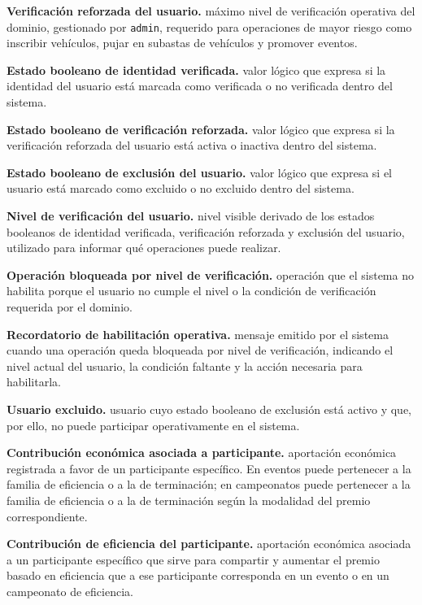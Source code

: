 \documentclass[10pt,letterpaper]{article}
\begin{document}
\noindent\textbf{Verificación reforzada del usuario.} máximo nivel de verificación operativa del dominio, gestionado por \texttt{admin}, requerido para operaciones de mayor riesgo como inscribir vehículos, pujar en subastas de vehículos y promover eventos.\par
\noindent\textbf{Estado booleano de identidad verificada.} valor lógico que expresa si la identidad del usuario está marcada como verificada o no verificada dentro del sistema.\par
\noindent\textbf{Estado booleano de verificación reforzada.} valor lógico que expresa si la verificación reforzada del usuario está activa o inactiva dentro del sistema.\par
\noindent\textbf{Estado booleano de exclusión del usuario.} valor lógico que expresa si el usuario está marcado como excluido o no excluido dentro del sistema.\par
\noindent\textbf{Nivel de verificación del usuario.} nivel visible derivado de los estados booleanos de identidad verificada, verificación reforzada y exclusión del usuario, utilizado para informar qué operaciones puede realizar.\par
\noindent\textbf{Operación bloqueada por nivel de verificación.} operación que el sistema no habilita porque el usuario no cumple el nivel o la condición de verificación requerida por el dominio.\par
\noindent\textbf{Recordatorio de habilitación operativa.} mensaje emitido por el sistema cuando una operación queda bloqueada por nivel de verificación, indicando el nivel actual del usuario, la condición faltante y la acción necesaria para habilitarla.\par
\noindent\textbf{Usuario excluido.} usuario cuyo estado booleano de exclusión está activo y que, por ello, no puede participar operativamente en el sistema.\par
\noindent\textbf{Contribución económica asociada a participante.} aportación económica registrada a favor de un participante específico. En eventos puede pertenecer a la familia de eficiencia o a la de terminación; en campeonatos puede pertenecer a la familia de eficiencia o a la de terminación según la modalidad del premio correspondiente.\par
\noindent\textbf{Contribución de eficiencia del participante.} aportación económica asociada a un participante específico que sirve para compartir y aumentar el premio basado en eficiencia que a ese participante corresponda en un evento o en un campeonato de eficiencia.\par
\end{document}
